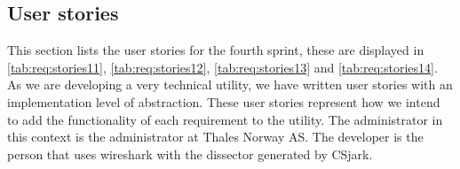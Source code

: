 \subsection{User stories}
\label{sec:req:stories4}
This section lists the user stories for the fourth sprint, these are displayed in \autoref{tab:req:stories11}, \autoref{tab:req:stories12}, \autoref{tab:req:stories13} and \autoref{tab:req:stories14}.
As we are developing a very technical \gls{utility}, we have written user stories with an implementation level of abstraction. 
These user stories represent how we intend to add the functionality of each requirement to the \gls{utility}.
The administrator in this context is the administrator at Thales Norway AS. 
The developer is the person that uses \Gls{wireshark} with the \gls{dissector} generated by CSjark.

